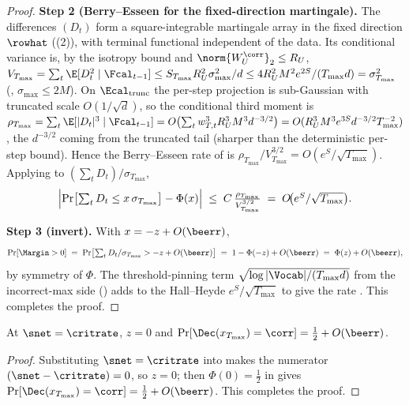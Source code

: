 \begin{proof}
\smallskip\noindent\textbf{Step 2 (Berry--Esseen for the fixed-direction
martingale).} The differences $(D_t)$ form a square-integrable martingale
array in the fixed direction $\rowhat$ ((2)),
with terminal functional independent of the data. Its conditional variance
is, by the isotropy bound  and
$\norm{W_U^{\corr}}_2\le R_U$,
$V_{T_{\max}}=\sum_t\E[D_t^2\mid\Fcal_{t-1}]\le S_{T_{\max}}R_U^2\sigma_{\max}^2/d\le4R_U^2M^2e^{2S}/(T_{\max}d)=\sigma_{T_{\max}}^2$
(, $\sigma_{\max}\le2M$). On $\Ecal_{\mathrm{trunc}}$
the per-step projection is sub-Gaussian with truncated scale $O(1/\sqrt d)$,
so the conditional third moment is
$\rho_{T_{\max}}=\sum_t\E[|D_t|^3\mid\Fcal_{t-1}]=O\bigl(\sum_t w_{T,t}^3 R_U^3 M^3 d^{-3/2}\bigr)=O(R_U^3 M^3 e^{3S}d^{-3/2}T_{\max}^{-2})$,
the $d^{-3/2}$ coming from the truncated tail (sharper than the
deterministic per-step bound). Hence the Berry--Esseen rate of
 is
$\rho_{T_{\max}}/V_{T_{\max}}^{3/2}=O(e^S/\sqrt{T_{\max}})$. Applying
 to $(\sum_t D_t)/\sigma_{T_{\max}}$,
\begin{align*}
   \Bigl|\Pr\bigl[\textstyle\sum_t D_t\le x\,\sigma_{T_{\max}}\bigr]-\Phi(x)\Bigr|
   \;\le\; C\,\frac{\rho_{T_{\max}}}{V_{T_{\max}}^{3/2}}
   \;=\; O\!\bigl(e^S/\sqrt{T_{\max}}\bigr).
\end{align*}

\smallskip\noindent\textbf{Step 3 (invert).} With $x=-z+O(\beerr)$,
\begin{align*}
   \Pr[\Margin>0]
   \;=\; \Pr\bigl[\textstyle\sum_t D_t/\sigma_{T_{\max}}>-z+O(\beerr)\bigr]
   \;=\; 1-\Phi(-z)+O(\beerr)
   \;=\; \Phi(z)+O(\beerr),
\end{align*}
by symmetry of $\Phi$. The threshold-pinning term
$\sqrt{\log|\Vocab|/(T_{\max}d)}$ from the incorrect-max side
() adds to the Hall--Heyde $e^S/\sqrt{T_{\max}}$ to
give the rate . This completes the proof.
\end{proof}

\begin{corollary}
\label{cor:R2_boundary}
At $\snet=\critrate$, $z=0$ and
$\Pr[\Dec(x_{T_{\max}})=\corr]=\tfrac12+O(\beerr)$.
\end{corollary}

\begin{proof}
Substituting $\snet=\critrate$ into  makes the numerator
$(\snet-\critrate)=0$, so $z=0$; then $\Phi(0)=\tfrac12$ in
 gives $\Pr[\Dec(x_{T_{\max}})=\corr]=\tfrac12+O(\beerr)$.
This completes the proof.
\end{proof}

